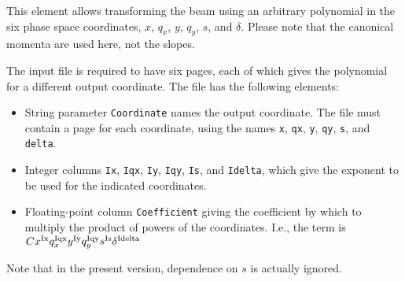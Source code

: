 This element allows transforming the beam using an arbitrary polynomial in the six phase space coordinates,
$x$, $q_x$, $y$, $q_y$, $s$, and $\delta$.
Please note that the canonical momenta are used here, not the slopes.

The input file is required to have six pages, each of which gives the polynomial for a different output coordinate.
The file has the following elements:
\begin{itemize}
\item String parameter \verb|Coordinate| names the output coordinate. The file must contain a page
      for each coordinate, using the names \verb|x|, \verb|qx|, \verb|y|, \verb|qy|, \verb|s|,
      and \verb|delta|.
\item Integer columns \verb|Ix|, \verb|Iqx|, \verb|Iy|, \verb|Iqy|, \verb|Is|, and \verb|Idelta|, which
      give the exponent to be used for the indicated coordinates.
\item Floating-point column \verb|Coefficient| giving the coefficient by which to multiply the 
      product of powers of the coordinates.
             I.e., the term is $C x^{\rm Ix} q_x^{\rm Iqx} y^{\rm Iy} q_y^{\rm Iqy}  s^{\rm Is} \delta^{\rm Idelta}$
\end{itemize}

Note that in the present version, dependence on $s$ is actually ignored.
